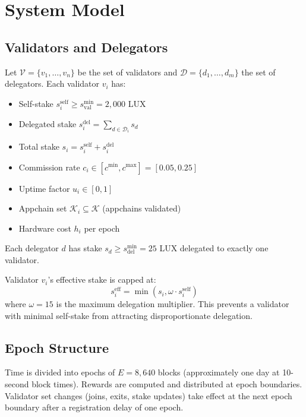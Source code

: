 \section{System Model}
\label{sec:model}

\subsection{Validators and Delegators}

Let $\mathcal{V} = \{v_1, \ldots, v_n\}$ be the set of validators and $\mathcal{D} = \{d_1, \ldots, d_m\}$ the set of delegators. Each validator $v_i$ has:
\begin{itemize}
    \item Self-stake $s_i^{\text{self}} \geq s^{\min}_{\text{val}} = 2{,}000$ LUX
    \item Delegated stake $s_i^{\text{del}} = \sum_{d \in \mathcal{D}_i} s_d$
    \item Total stake $s_i = s_i^{\text{self}} + s_i^{\text{del}}$
    \item Commission rate $c_i \in [c^{\min}, c^{\max}] = [0.05, 0.25]$
    \item Uptime factor $u_i \in [0, 1]$
    \item Appchain set $\mathcal{K}_i \subseteq \mathcal{K}$ (appchains validated)
    \item Hardware cost $h_i$ per epoch
\end{itemize}

Each delegator $d$ has stake $s_d \geq s^{\min}_{\text{del}} = 25$ LUX delegated to exactly one validator.

\begin{definition}
Validator $v_i$'s effective stake is capped at:
\begin{equation}
    s_i^{\text{eff}} = \min(s_i, \omega \cdot s_i^{\text{self}})
\end{equation}
where $\omega = 15$ is the maximum delegation multiplier. This prevents a validator with minimal self-stake from attracting disproportionate delegation.
\end{definition}

\subsection{Epoch Structure}

Time is divided into epochs of $E = 8{,}640$ blocks (approximately one day at 10-second block times). Rewards are computed and distributed at epoch boundaries. Validator set changes (joins, exits, stake updates) take effect at the next epoch boundary after a registration delay of one epoch.

